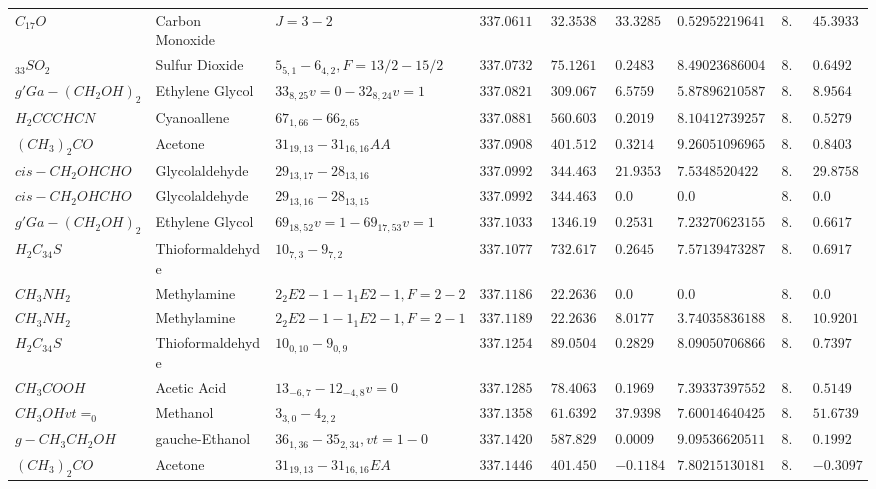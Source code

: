 \documentclass{aa}
\begin{document}
\begin{table}
\begin{tabular}{l l l l l l l l l}
$C_{17}O$ & Carbon Monoxide & $J=3-2$ & $337.0611$ & $32.3538$ & $33.3285$ & $0.529522196414$ & $8.0$ & $45.3933$\\
$_{33}SO_{2}$ & Sulfur Dioxide & $5_{5,1}-6_{4,2},F=13/2-15/2$ & $337.07327$ & $75.1261$ & $0.2483$ & $8.49023686004$ & $8.0$ & $0.6492$\\
$g'Ga-(CH_{2}OH)_{2}$ & Ethylene Glycol & $33_{8,25}v=0-32_{8,24}v=1$ & $337.08211$ & $309.0677$ & $6.5759$ & $5.87896210587$ & $8.0$ & $8.9564$\\
$H_{2}CCCHCN$ & Cyanoallene & $67_{1,66}-66_{2,65}$ & $337.08811$ & $560.6032$ & $0.2019$ & $8.10412739257$ & $8.0$ & $0.5279$\\
$(CH_{3})_{2}CO$ & Acetone & $31_{19,13}-31_{16,16}AA$ & $337.09083$ & $401.5121$ & $0.3214$ & $9.26051096965$ & $8.0$ & $0.8403$\\
$cis-CH_{2}OHCHO$ & Glycolaldehyde & $29_{13,17}-28_{13,16}$ & $337.09926$ & $344.463$ & $21.9353$ & $7.5348520422$ & $8.0$ & $29.8758$\\
$cis-CH_{2}OHCHO$ & Glycolaldehyde & $29_{13,16}-28_{13,15}$ & $337.09927$ & $344.463$ & $0.0$ & $0.0$ & $8.0$ & $0.0$\\
$g'Ga-(CH_{2}OH)_{2}$ & Ethylene Glycol & $69_{18,52}v=1-69_{17,53}v=1$ & $337.10336$ & $1346.196$ & $0.2531$ & $7.23270623155$ & $8.0$ & $0.6617$\\
$H_{2}C_{34}S$ & Thioformaldehyde & $10_{7,3}-9_{7,2}$ & $337.10773$ & $732.617$ & $0.2645$ & $7.57139473287$ & $8.0$ & $0.6917$\\
$CH_{3}NH_{2}$ & Methylamine & $2_{2}E2-1-1_{1}E2-1,F=2-2$ & $337.11864$ & $22.2636$ & $0.0$ & $0.0$ & $8.0$ & $0.0$\\
$CH_{3}NH_{2}$ & Methylamine & $2_{2}E2-1-1_{1}E2-1,F=2-1$ & $337.11894$ & $22.2636$ & $8.0177$ & $3.74035836188$ & $8.0$ & $10.9201$\\
$H_{2}C_{34}S$ & Thioformaldehyde & $10_{0,10}-9_{0,9}$ & $337.12546$ & $89.0504$ & $0.2829$ & $8.09050706866$ & $8.0$ & $0.7397$\\
$CH_{3}COOH$ & Acetic Acid & $13_{-6,7}-12_{-4,8}v=0$ & $337.12857$ & $78.4063$ & $0.1969$ & $7.39337397552$ & $8.0$ & $0.5149$\\
$CH_{3}OHvt=_{0}$ & Methanol & $3_{3,0}-4_{2,2}$ & $337.13586$ & $61.6392$ & $37.9398$ & $7.60014640425$ & $8.0$ & $51.6739$\\
$g-CH_{3}CH_{2}OH$ & gauche-Ethanol & $36_{1,36}-35_{2,34},vt=1-0$ & $337.14207$ & $587.8293$ & $0.0009$ & $9.09536620511$ & $8.0$ & $0.1992$\\
$(CH_{3})_{2}CO$ & Acetone & $31_{19,13}-31_{16,16}EA$ & $337.1446$ & $401.4505$ & $-0.1184$ & $7.80215130181$ & $8.0$ & $-0.3097$\\

\end{tabular}
\end{table}
\end{document}
